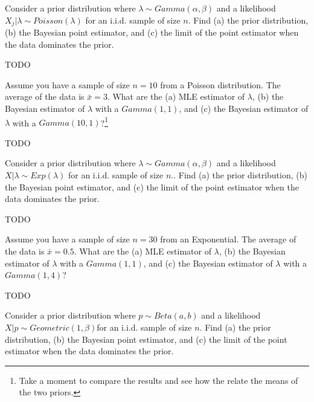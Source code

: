 
Consider a prior distribution where $\lambda \sim Gamma(\alpha, \beta)$ and a 
likelihood $X_j|\lambda \sim Poisson(\lambda)$ for an i.i.d. sample of size $n$.
Find (a) the prior distribution, (b) the Bayesian point estimator, and (c) the
limit of the point estimator when the data dominates the prior.


TODO


Assume you have a sample of size $n = 10$ from a Poisson distribution. The 
average of the data is $\bar{x} = 3$. What are the (a) MLE estimator of $\lambda$,
(b) the Bayesian estimator of $\lambda$ with a $Gamma(1, 1)$, and (c) the
Bayesian estimator of $\lambda$ with a $Gamma(10, 1)$?\footnote{
  Take a moment to compare the results and see how the relate the means of the
  two priors.
}


TODO


Consider a prior distribution where $\lambda \sim Gamma(\alpha, \beta)$ and a 
likelihood $X|\lambda \sim Exp(\lambda)$ for an i.i.d. sample of size $n$..
Find (a) the prior distribution, (b) the Bayesian point estimator, and (c) the
limit of the point estimator when the data dominates the prior.


TODO


Assume you have a sample of size $n = 30$ from an Exponential. The 
average of the data is $\bar{x} = 0.5$. What are the (a) MLE estimator of $\lambda$,
(b) the Bayesian estimator of $\lambda$ with a $Gamma(1, 1)$, and (c) the
Bayesian estimator of $\lambda$ with a $Gamma(1, 4)$?


TODO


Consider a prior distribution where $p \sim Beta(a, b)$ and a 
likelihood $X|p \sim Geometric(1, \beta)$for an i.i.d. sample of size $n$.
Find (a) the prior distribution, (b) the Bayesian point estimator, and (c) the
limit of the point estimator when the data dominates the prior.

